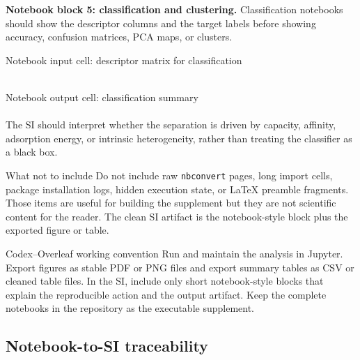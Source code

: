 \documentclass[journal=jacsat,manuscript=article]{achemso}
\begin{document}
\noindent\textbf{Notebook block 5: classification and clustering.}
Classification notebooks should show the descriptor columns and the target
labels before showing accuracy, confusion matrices, PCA maps, or clusters.

\begin{bluebox}{Notebook input cell: descriptor matrix for classification}
\small
\noindent\texttt{}\\
\texttt{}\\
\texttt{}
\end{bluebox}

\begin{greenbox}{Notebook output cell: classification summary}
\small
\noindent\texttt{}\\
\texttt{}\\
The SI should interpret whether the separation is driven by capacity, affinity,
adsorption energy, or intrinsic heterogeneity, rather than treating the
classifier as a black box.
\end{greenbox}

\begin{redbox}{What not to include}
	Do not include raw \texttt{nbconvert} pages, long import cells, package
	installation logs, hidden execution state, or LaTeX preamble fragments. Those
	items are useful for building the supplement but they are not scientific
	content for the reader. The clean SI artifact is the notebook-style block plus
	the exported figure or table.
\end{redbox}

\begin{bluebox}{Codex--Overleaf working convention}
	Run and maintain the analysis in Jupyter. Export figures as stable PDF or PNG
	files and export summary tables as CSV or cleaned table files. In the SI,
	include only short notebook-style blocks that explain the reproducible action
	and the output artifact. Keep the complete notebooks in the repository as the
	executable supplement.
\end{bluebox}
\subsection{Notebook-to-SI traceability}
\label{sec:si_notebook_traceability}
\end{document}
